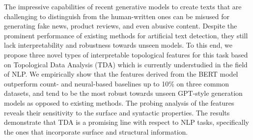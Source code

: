The impressive capabilities of recent generative models to create texts that are challenging to distinguish from the human-written ones can be misused for generating fake news, product reviews, and even abusive content. Despite the prominent performance of existing methods for artificial text detection, they still lack interpretability and robustness towards unseen models. To this end, we propose three novel types of interpretable topological features for this task based on Topological Data Analysis (TDA) which is currently understudied in the field of NLP. We empirically show that the features derived from the BERT model outperform count- and neural-based baselines up to 10\% on three common datasets, and tend to be the most robust towards unseen GPT-style generation models as opposed to existing methods. The probing analysis of the features reveals their sensitivity to the surface and syntactic properties. The results demonstrate that TDA is a promising line with respect to NLP tasks, specifically the ones that incorporate surface and structural information.
